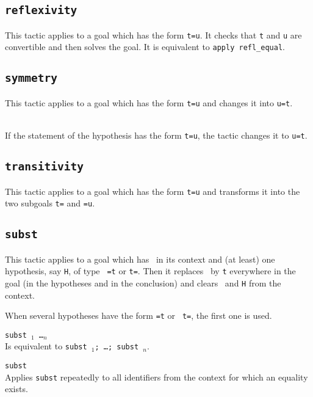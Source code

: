 \subsection{\tt reflexivity
\label{reflexivity}
}

This tactic applies to a goal which has the form {\tt t=u}. It checks
that {\tt t} and {\tt u} are convertible and then solves the goal.
It is equivalent to {\tt apply refl\_equal}.

\begin{ErrMsgs}
\item {}
\item {}
\end{ErrMsgs}

\subsection{\tt symmetry
}
This tactic applies to a goal which has the form {\tt t=u} and changes it
into {\tt u=t}.

\\
If the statement of the hypothesis {\ident} has the form {\tt t=u},
the tactic changes it to {\tt u=t}.

\subsection{\tt transitivity \term
{}}
This tactic applies to a goal which has the form {\tt t=u}
and transforms it into the two subgoals 
{\tt t={\term}} and {\tt {\term}=u}.

\subsection{\tt subst {\ident}
}

This tactic applies to a goal which has \ident\ in its context and
(at least) one hypothesis, say {\tt H}, of type {\tt
  \ident=t} or {\tt t=\ident}. Then it replaces 
\ident\ by {\tt t} everywhere in the goal (in the hypotheses 
and in the conclusion) and clears \ident\ and {\tt H} from the context.

\Rem 
When several hypotheses have the form {\tt \ident=t} or {\tt
  t=\ident}, the first one is used. 

\begin{Variants}
  \item {\tt subst \ident$_1$ \dots \ident$_n$} \\
    Is equivalent to {\tt subst \ident$_1$; \dots; subst \ident$_n$}.
  \item {\tt subst} \\
    Applies {\tt subst} repeatedly to all identifiers from the context
    for which an equality exists.
\end{Variants}

